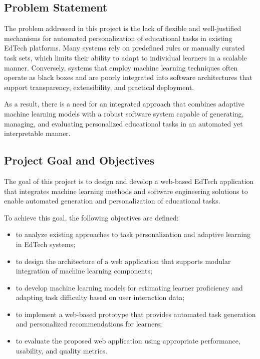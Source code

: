\documentclass[a4paper,12pt]{extarticle}
\begin{document}
\subsection{Problem Statement}

The problem addressed in this project is the lack of flexible and well-justified mechanisms for automated personalization of educational tasks in existing EdTech platforms. Many systems rely on predefined rules or manually curated task sets, which limits their ability to adapt to individual learners in a scalable manner. Conversely, systems that employ machine learning techniques often operate as black boxes and are poorly integrated into software architectures that support transparency, extensibility, and practical deployment.

As a result, there is a need for an integrated approach that combines adaptive machine learning models with a robust software system capable of generating, managing, and evaluating personalized educational tasks in an automated yet interpretable manner.

\subsection{Project Goal and Objectives}

The goal of this project is to design and develop a web-based EdTech application that integrates machine learning methods and software engineering solutions to enable automated generation and personalization of educational tasks.

To achieve this goal, the following objectives are defined:
\begin{itemize}
    \item to analyze existing approaches to task personalization and adaptive learning in EdTech systems;
    \item to design the architecture of a web application that supports modular integration of machine learning components;
    \item to develop machine learning models for estimating learner proficiency and adapting task difficulty based on user interaction data;
    \item to implement a web-based prototype that provides automated task generation and personalized recommendations for learners;
    \item to evaluate the proposed web application using appropriate performance, usability, and quality metrics.
\end{itemize}
\end{document}
